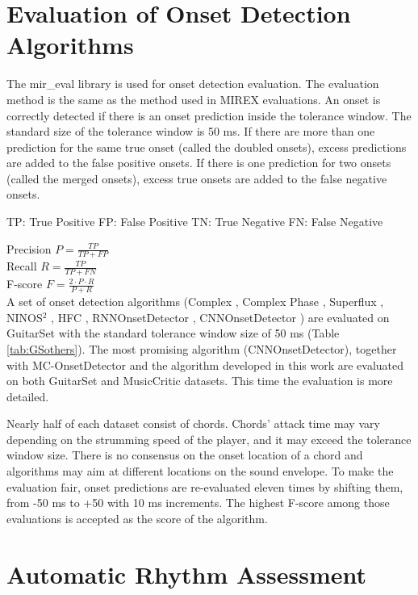 \section{Evaluation of Onset Detection Algorithms}

The mir\_eval \cite{raffel2014mir_eval} library is used for onset detection evaluation. The evaluation method is the same as the method used in MIREX evaluations. An onset is correctly detected if there is an onset prediction inside the tolerance window. The standard size of the tolerance window is 50 ms. If there are more than one prediction for the same true onset (called the doubled onsets), excess predictions are added to the false positive onsets. If there is one prediction for two onsets (called the merged onsets), excess true onsets are added to the false negative onsets.

TP: True Positive
FP: False Positive
TN: True Negative
FN: False Negative

Precision \(P = \frac{TP}{TP+FP}\)\\
Recall \(R = \frac{TP}{TP+FN}\)\\
F-score \(F = \frac{2\cdot P\cdot R}{P+R}\)\\

A set of onset detection algorithms (Complex \cite{bello2004use}, Complex Phase \cite{brossier2004fast}, Superflux \cite{bock2013maximum}, NINOS$^2$ \cite{mounir2016guitar},  HFC \cite{masri1996imroved}, RNNOnsetDetector \cite{eyben2010universal}, CNNOnsetDetector \cite{schluter2014improved}) are evaluated on GuitarSet with the standard tolerance window size of 50 ms (Table \ref{tab:GSothers}). The most promising algorithm (CNNOnsetDetector), together with MC-OnsetDetector and the algorithm developed in this work are evaluated on both GuitarSet and MusicCritic datasets. This time the evaluation is more detailed.

Nearly half of each dataset consist of chords. Chords' attack time may vary depending on the strumming speed of the player, and it may exceed the tolerance window size. There is no consensus on the onset location of a chord and algorithms may aim at different locations on the sound envelope. To make the evaluation fair, onset predictions are re-evaluated eleven times by shifting them, from -50 ms to +50 with 10 ms increments. The highest F-score among those evaluations is accepted as the score of the algorithm. 

\section{Automatic Rhythm Assessment}\label{assessmethod}

